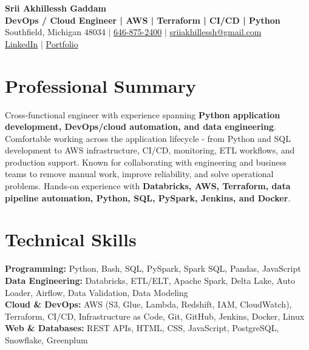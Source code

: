 \documentclass[letterpaper,10pt]{article}
\begin{document}
\fontsize{9.35pt}{10.45pt}\selectfont

\begin{center}
    {\LARGE \textbf{Srii Akhillessh Gaddam}} \\[-1pt]
    \textbf{DevOps / Cloud Engineer | AWS | Terraform | CI/CD | Python} \\[2pt]
    Southfield, Michigan 48034 $|$
    \href{tel:6468752400}{646-875-2400} $|$
    \href{mailto:sriiakhillessh@gmail.com}{sriiakhillessh@gmail.com} \\[1pt]
    \href{https://www.linkedin.com/in/srii-akhiilessh-gaddam-b48668191/}{LinkedIn} $|$
    \href{https://sriiakhillesshg.github.io/portfolio/}{Portfolio}
\end{center}
\vspace{-8pt}

\section{Professional Summary}
\small{Cross-functional engineer with experience spanning \textbf{Python application development, DevOps/cloud automation, and data engineering}. Comfortable working across the application lifecycle - from Python and SQL development to AWS infrastructure, CI/CD, monitoring, ETL workflows, and production support. Known for collaborating with engineering and business teams to remove manual work, improve reliability, and solve operational problems. Hands-on experience with \textbf{Databricks, AWS, Terraform, data pipeline automation, Python, SQL, PySpark, Jenkins, and Docker}.}

\section{Technical Skills}
\small{
\textbf{Programming:} Python, Bash, SQL, PySpark, Spark SQL, Pandas, JavaScript \\
\textbf{Data Engineering:} Databricks, ETL/ELT, Apache Spark, Delta Lake, Auto Loader, Airflow, Data Validation, Data Modeling \\
\textbf{Cloud \& DevOps:} AWS (S3, Glue, Lambda, Redshift, IAM, CloudWatch), Terraform, CI/CD, Infrastructure as Code, Git, GitHub, Jenkins, Docker, Linux \\
\textbf{Web \& Databases:} REST APIs, HTML, CSS, JavaScript, PostgreSQL, Snowflake, Greenplum
}
\end{document}
